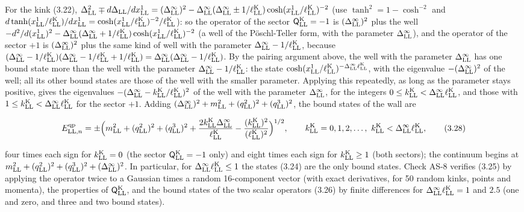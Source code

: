 \documentclass[
  10pt,
]{article}
\begin{document}
For the kink (3.22),
\(\Delta_{\rm LL}^2\mp d\Delta_{\rm LL}/dx^1_{\rm LL}=(\Delta^\infty_{\rm LL})^2-\Delta^\infty_{\rm LL}(\Delta^\infty_{\rm LL}\pm1/\ell^{\rm K}_{\rm LL})\cosh(x^1_{\rm LL}/\ell^{\rm K}_{\rm LL})^{-2}\)
(use \(\tanh^2=1-\cosh^{-2}\) and
\(d\tanh(x^1_{\rm LL}/\ell^{\rm K}_{\rm LL})/dx^1_{\rm LL}=\cosh(x^1_{\rm LL}/\ell^{\rm K}_{\rm LL})^{-2}/\ell^{\rm K}_{\rm LL}\)):
so the operator of the sector \(\mathsf Q^{\rm K}_{\rm LL}=-1\) is
\((\Delta^\infty_{\rm LL})^2\) plus the well
\(-d^2/d(x^1_{\rm LL})^2-\Delta^\infty_{\rm LL}(\Delta^\infty_{\rm LL}+1/\ell^{\rm K}_{\rm LL})\cosh(x^1_{\rm LL}/\ell^{\rm K}_{\rm LL})^{-2}\)
(a well of the Pöschl-Teller form, with the parameter
\(\Delta^\infty_{\rm LL}\)), and the operator of the sector \(+1\) is
\((\Delta^\infty_{\rm LL})^2\) plus the same kind of well with the
parameter \(\Delta^\infty_{\rm LL}-1/\ell^{\rm K}_{\rm LL}\), because
\((\Delta^\infty_{\rm LL}-1/\ell^{\rm K}_{\rm LL})(\Delta^\infty_{\rm LL}-1/\ell^{\rm K}_{\rm LL}+1/\ell^{\rm K}_{\rm LL})=\Delta^\infty_{\rm LL}(\Delta^\infty_{\rm LL}-1/\ell^{\rm K}_{\rm LL})\).
By the pairing argument above, the well with the parameter
\(\Delta^\infty_{\rm LL}\) has one bound state more than the well with
the parameter \(\Delta^\infty_{\rm LL}-1/\ell^{\rm K}_{\rm LL}\): the
state
\(\cosh(x^1_{\rm LL}/\ell^{\rm K}_{\rm LL})^{-\Delta^\infty_{\rm LL}\ell^{\rm K}_{\rm LL}}\),
with the eigenvalue \(-(\Delta^\infty_{\rm LL})^2\) of the well; all its
other bound states are those of the well with the smaller parameter.
Applying this repeatedly, as long as the parameter stays positive, gives
the eigenvalues
\(-(\Delta^\infty_{\rm LL}-k^{\rm K}_{\rm LL}/\ell^{\rm K}_{\rm LL})^2\)
of the well with the parameter \(\Delta^\infty_{\rm LL}\), for the
integers
\(0\le k^{\rm K}_{\rm LL}<\Delta^\infty_{\rm LL}\ell^{\rm K}_{\rm LL}\),
and those with
\(1\le k^{\rm K}_{\rm LL}<\Delta^\infty_{\rm LL}\ell^{\rm K}_{\rm LL}\)
for the sector \(+1\). Adding
\((\Delta^\infty_{\rm LL})^2+m_{\rm LL}^2+(q^2_{\rm LL})^2+(q^3_{\rm LL})^2\),
the bound states of the wall are

\[E^{\rm qp}_{{\rm LL},n}=\pm\Big(m_{\rm LL}^2+(q^2_{\rm LL})^2+(q^3_{\rm LL})^2+\frac{2k^{\rm K}_{\rm LL}\Delta^\infty_{\rm LL}}{\ell^{\rm K}_{\rm LL}}-\frac{(k^{\rm K}_{\rm LL})^2}{(\ell^{\rm K}_{\rm LL})^2}\Big)^{1/2},\qquad k^{\rm K}_{\rm LL}=0,1,2,\dots,\ k^{\rm K}_{\rm LL}<\Delta^\infty_{\rm LL}\ell^{\rm K}_{\rm LL},\tag{3.28}\]

four times each sign for \(k^{\rm K}_{\rm LL}=0\) (the sector
\(\mathsf Q^{\rm K}_{\rm LL}=-1\) only) and eight times each sign for
\(k^{\rm K}_{\rm LL}\ge1\) (both sectors); the continuum begins at
\(m_{\rm LL}^2+(q^2_{\rm LL})^2+(q^3_{\rm LL})^2+(\Delta^\infty_{\rm LL})^2\).
In particular, for \(\Delta^\infty_{\rm LL}\ell^{\rm K}_{\rm LL}\le1\)
the states (3.24) are the only bound states. Check AS-8 verifies (3.25)
by applying the operator twice to a Gaussian times a random 16-component
vector (with exact derivatives, for 50 random kinks, points and
momenta), the properties of \(\mathsf Q^{\rm K}_{\rm LL}\), and the
bound states of the two scalar operators (3.26) by finite differences
for \(\Delta^\infty_{\rm LL}\ell^{\rm K}_{\rm LL}=1\) and \(2.5\) (one
and zero, and three and two bound states).
\end{document}
